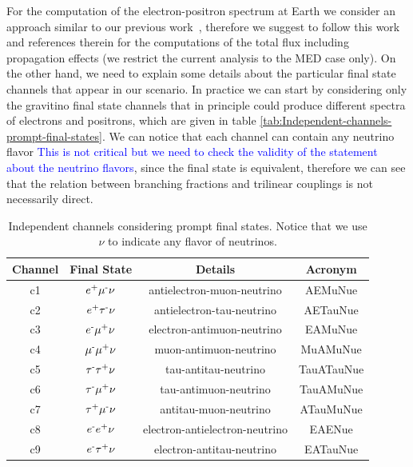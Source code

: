\documentclass[a4paper,11pt]{article}
\newcommand*{\blue}{\textcolor{blue}}
\begin{document}
For the computation of the electron-positron spectrum at Earth we consider an approach similar to our previous work~\cite{Carquin:2015uma}, therefore we suggest to follow this work and references therein for the computations of the total flux including propagation effects (we restrict the current analysis to the MED case only). On the other hand, we need to explain some details about the particular final state channels that appear in our scenario. In practice we can start by considering only the gravitino final state channels that in principle could produce different spectra of electrons and positrons, which are given in table \ref{tab:Independent-channels-prompt-final-states}. We can notice that each channel can contain any neutrino flavor \blue{This is not critical but we need to check the validity of the statement about the neutrino flavors}, since the final state is equivalent, therefore we can see that the relation between branching fractions and trilinear couplings is not necessarily direct.

\begin{table}
\centering{}%
\begin{tabular}{|c|c|c|c|}
\hline 
Channel & Final State & Details & Acronym\tabularnewline
\hline 
\hline 
c1 & $e\text{\textsuperscript{+}}\mu\text{\textsuperscript{-}}\nu$ & antielectron-muon-neutrino & AEMuNue\tabularnewline
\hline 
c2 & $e\text{\textsuperscript{+}}\tau\text{\textsuperscript{-}}\nu$ & antielectron-tau-neutrino & AETauNue\tabularnewline
\hline 
c3 & $e\text{\textsuperscript{-}}\mu\text{\textsuperscript{+}}\nu$ & electron-antimuon-neutrino & EAMuNue\tabularnewline
\hline 
c4 & $\mu\text{\textsuperscript{-}}\mu\text{\textsuperscript{+}}\nu$ & muon-antimuon-neutrino & MuAMuNue\tabularnewline
\hline 
c5 & $\tau\text{\textsuperscript{-}}\tau\text{\textsuperscript{+}}\nu$ & tau-antitau-neutrino & TauATauNue\tabularnewline
\hline 
c6 & $\tau\text{\textsuperscript{-}}\mu\text{\textsuperscript{+}}\nu$ & tau-antimuon-neutrino & TauAMuNue\tabularnewline
\hline 
c7 & $\tau\text{\textsuperscript{+}}\mu\text{\textsuperscript{-}}\nu$ & antitau-muon-neutrino & ATauMuNue\tabularnewline
\hline 
c8 & $e\text{\textsuperscript{-}}e\text{\textsuperscript{+}}\nu$ & electron-antielectron-neutrino & EAENue\tabularnewline
\hline 
c9 & $e\text{\textsuperscript{-}}\tau\text{\textsuperscript{+}}\nu$ & electron-antitau-neutrino & EATauNue\tabularnewline
\hline 
\end{tabular}\caption{\label{tab:Independent-channels-prompt-final-states}Independent channels
considering prompt final states. Notice that we use $\nu$ to indicate
any flavor of neutrinos. }
\label{table:accesible-decay-channels-TRpV}
\end{table}
\end{document}
